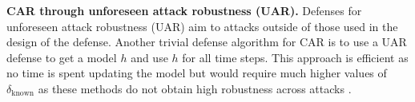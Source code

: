 \noindent
\textbf{CAR through unforeseen attack robustness (UAR). } Defenses for unforeseen attack robustness (UAR) aim to attacks outside of those used in the design of the defense. Another trivial defense algorithm for CAR is to use a UAR defense \citep{laidlaw2020perceptual,dai2022formulating} to get a model $h$ and use $h$ for all time steps.  This approach is efficient as no time is spent updating the model but would require much higher values of $\delta_{\text{known}}$ as these methods do not obtain high robustness across attacks \citep{dai2023multirobustbench}.%
